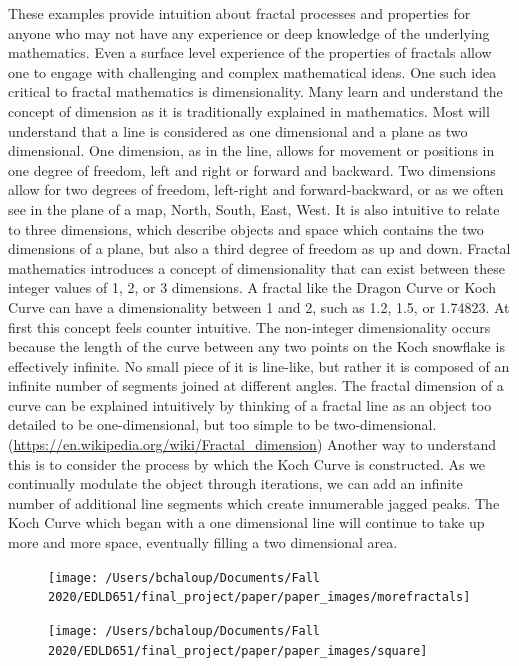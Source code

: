 \documentclass[english,jou]{apa6}
\begin{document}
These examples provide intuition about fractal processes and properties for anyone who may not have any experience or deep knowledge of the underlying mathematics. Even a surface level experience of the properties of fractals allow one to engage with challenging and complex mathematical ideas. One such idea critical to fractal mathematics is dimensionality. Many learn and understand the concept of dimension as it is traditionally explained in mathematics. Most will understand that a line is considered as one dimensional and a plane as two dimensional. One dimension, as in the line, allows for movement or positions in one degree of freedom, left and right or forward and backward. Two dimensions allow for two degrees of freedom, left-right and forward-backward, or as we often see in the plane of a map, North, South, East, West. It is also intuitive to relate to three dimensions, which describe objects and space which contains the two dimensions of a plane, but also a third degree of freedom as up and down. Fractal mathematics introduces a concept of dimensionality that can exist between these integer values of 1, 2, or 3 dimensions. A fractal like the Dragon Curve or Koch Curve can have a dimensionality between 1 and 2, such as 1.2, 1.5, or 1.74823. At first this concept feels counter intuitive. The non-integer dimensionality occurs because the length of the curve between any two points on the Koch snowflake is effectively infinite. No small piece of it is line-like, but rather it is composed of an infinite number of segments joined at different angles. The fractal dimension of a curve can be explained intuitively by thinking of a fractal line as an object too detailed to be one-dimensional, but too simple to be two-dimensional. (\url{https://en.wikipedia.org/wiki/Fractal_dimension}) Another way to understand this is to consider the process by which the Koch Curve is constructed. As we continually modulate the object through iterations, we can add an infinite number of additional line segments which create innumerable jagged peaks. The Koch Curve which began with a one dimensional line will continue to take up more and more space, eventually filling a two dimensional area.

\begin{figure}

{\centering \texttt{[image: /Users/bchaloup/Documents/Fall 2020/EDLD651/final\_project/paper/paper\_images/morefractals]} 

}

\caption{ }\label{fig:unnamed-chunk-4-1}
\end{figure}
\begin{figure}

{\centering \texttt{[image: /Users/bchaloup/Documents/Fall 2020/EDLD651/final\_project/paper/paper\_images/square]} 

}

\caption{ }\label{fig:unnamed-chunk-4-2}
\end{figure}
\end{document}
